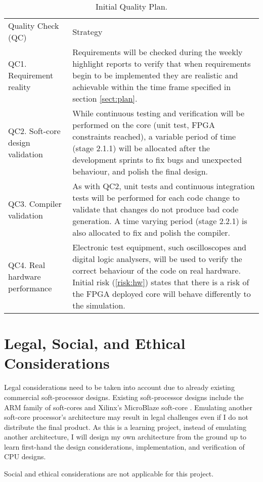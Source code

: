 \documentclass[11pt,a4paper]{article}
\begin{document}
\begin{table}[h]
    \begin{tabularx}{\textwidth}{|l|X|}
    \hline
    Quality Check (QC) & Strategy \\
	\specialrule{2pt}{-2pt}{0pt}
	QC1. Requirement reality & Requirements will be checked during the weekly highlight reports to verify that when requirements begin to be implemented they are realistic and achievable within the time frame specified in section \ref{sect:plan}.
	\\ \hline
	
	QC2. Soft-core design validation & While continuous testing and verification will be performed on the core (unit test, FPGA constraints reached), a variable period of time (stage 2.1.1) will be allocated after the development sprints to fix bugs and unexpected behaviour, and polish the final design. 
	\\ \hline
	
	QC3. Compiler validation & As with QC2, unit tests and continuous integration tests will be performed for each code change to validate that changes do not produce bad code generation. A time varying period (stage 2.2.1) is also allocated to fix and polish the compiler.
	\\ \hline
	
	QC4. Real hardware performance & Electronic test equipment, such oscilloscopes and digital logic analysers, will be used to verify the correct behaviour of the code on real hardware. Initial risk (\ref{risk:hw}) states that there is a risk of the FPGA deployed core will behave differently to the simulation.
	\\ \hline
    \end{tabularx}
    \caption{Initial Quality Plan.}
\end{table}


\section{Legal, Social, and Ethical Considerations}\label{sect:legal}
Legal considerations need to be taken into account due to already existing commercial soft-processor designs. Existing soft-processor designs include the ARM family of soft-cores \citep{arm} and Xilinx's MicroBlaze soft-core \citep{microblaze}. Emulating another soft-core processor's architecture may result in legal challenges even if I do not distribute the final product. As this is a learning project, instead of emulating another architecture, I will design my own architecture from the ground up to learn first-hand the design considerations, implementation, and verification of CPU designs.

Social and ethical considerations are not applicable for this project.

\newpage
 
\end{document}
